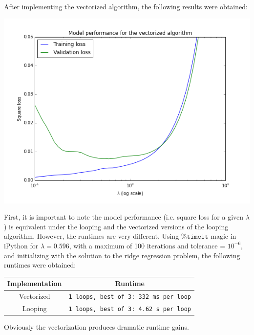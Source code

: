 \documentclass[paper=a4, fontsize=11pt]{scrartcl} %
\numberwithin{equation}{section} %
\numberwithin{figure}{section} %
\numberwithin{table}{section} %
\begin{document}
After implementing the vectorized algorithm, the following results were obtained:

\begin{center} \includegraphics[scale=0.65]{./../figures/2_1_vectorized.png} \end{center}

First, it is important to note the model performance (i.e. square loss for a given $\lambda$) is equivalent under the looping and the vectorized versions of the looping algorithm. However, the runtimes are very different. Using $\texttt{\%timeit}$ magic in iPython for $\lambda = 0.596$, with a maximum of 100 iterations and tolerance = $10^{-6}$, and initializing with the solution to the ridge regression problem, the following runtimes were obtained:

\begin{center}
\begin{tabular}{| c | c |}
\hline
	\textbf{Implementation} & \textbf{Runtime}\\
\hline
	Vectorized & \texttt{1 loops, best of 3: 332 ms per loop} \\
\hline
	Looping &  \texttt{1 loops, best of 3: 4.62 s per loop} \\
\hline
\end{tabular}
\end{center}

Obviously the vectorization produces dramatic runtime gains.


\end{document}
